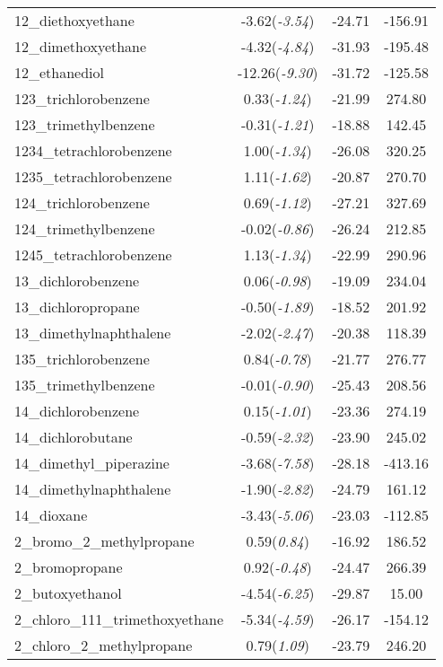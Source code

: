 \documentclass{amsart}
\begin{document}
\begin{center}
\begin{longtable}{l|c|c|c}
12\_diethoxyethane & -3.62(\textit{-3.54}) & -24.71 & -156.91 \\ 
12\_dimethoxyethane & -4.32(\textit{-4.84}) & -31.93 & -195.48 \\ 
12\_ethanediol & -12.26(\textit{-9.30}) & -31.72 & -125.58 \\ 
123\_trichlorobenzene & 0.33(\textit{-1.24}) & -21.99 & 274.80 \\ 
123\_trimethylbenzene & -0.31(\textit{-1.21}) & -18.88 & 142.45 \\ 
1234\_tetrachlorobenzene & 1.00(\textit{-1.34}) & -26.08 & 320.25 \\ 
1235\_tetrachlorobenzene & 1.11(\textit{-1.62}) & -20.87 & 270.70 \\ 
124\_trichlorobenzene & 0.69(\textit{-1.12}) & -27.21 & 327.69 \\ 
124\_trimethylbenzene & -0.02(\textit{-0.86}) & -26.24 & 212.85 \\ 
1245\_tetrachlorobenzene & 1.13(\textit{-1.34}) & -22.99 & 290.96 \\ 
13\_dichlorobenzene & 0.06(\textit{-0.98}) & -19.09 & 234.04 \\ 
13\_dichloropropane & -0.50(\textit{-1.89}) & -18.52 & 201.92 \\ 
13\_dimethylnaphthalene & -2.02(\textit{-2.47}) & -20.38 & 118.39 \\ 
135\_trichlorobenzene & 0.84(\textit{-0.78}) & -21.77 & 276.77 \\ 
135\_trimethylbenzene & -0.01(\textit{-0.90}) & -25.43 & 208.56 \\ 
14\_dichlorobenzene & 0.15(\textit{-1.01}) & -23.36 & 274.19 \\ 
14\_dichlorobutane & -0.59(\textit{-2.32}) & -23.90 & 245.02 \\ 
14\_dimethyl\_piperazine & -3.68(\textit{-7.58}) & -28.18 & -413.16 \\ 
14\_dimethylnaphthalene & -1.90(\textit{-2.82}) & -24.79 & 161.12 \\ 
14\_dioxane & -3.43(\textit{-5.06}) & -23.03 & -112.85 \\ 
2\_bromo\_2\_methylpropane & 0.59(\textit{0.84}) & -16.92 & 186.52 \\ 
2\_bromopropane & 0.92(\textit{-0.48}) & -24.47 & 266.39 \\ 
2\_butoxyethanol & -4.54(\textit{-6.25}) & -29.87 & 15.00 \\ 
2\_chloro\_111\_trimethoxyethane & -5.34(\textit{-4.59}) & -26.17 & -154.12 \\ 
2\_chloro\_2\_methylpropane & 0.79(\textit{1.09}) & -23.79 & 246.20 \\ 

\end{longtable}
\end{center}
\end{document}
